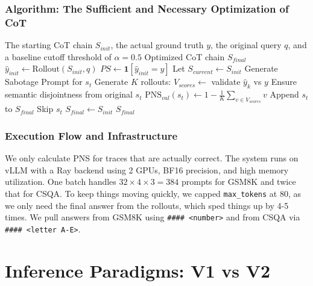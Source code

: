 \documentclass[conference,compsoc]{IEEEtran}
\begin{document}
\subsubsection{Algorithm: The Sufficient and Necessary Optimization of CoT}
\begin{algorithm}
\caption{Optimizing the CoT Sequence for Necessity and Sufficiency}
\begin{algorithmic}[1]
\REQUIRE The starting CoT chain $S_{init}$, the actual ground truth $y$, the original query $q$, and a baseline cutoff threshold of $\alpha=0.5$
\ENSURE Optimized CoT chain $S_{final}$
\STATE $\hat{y}_{init} \leftarrow \text{Rollout}(S_{init}, q)$
\STATE $PS \leftarrow \mathbf{1}[\hat{y}_{init} = y]$
    \STATE Let $S_{current} \leftarrow S_{init}$
        \STATE Generate Sabotage Prompt for $s_t$
        \STATE Generate $K$ rollouts: $V_{scores} \leftarrow$ validate $\hat{y}_k$ vs $y$
        \STATE Ensure semantic disjointness from original $s_t$
        \STATE $\text{PNS}_{val}(s_t) \leftarrow 1 - \frac{1}{K} \sum_{v \in V_{scores}} v$
            \STATE Append $s_t$ to $S_{final}$ 
        \ELSE
            \STATE Skip $s_t$ 
        \ENDIF
    \ENDFOR
\ELSE
    \STATE $S_{final} \leftarrow S_{init}$ 
\ENDIF
\RETURN $S_{final}$
\end{algorithmic}
\end{algorithm}

\subsubsection{Execution Flow and Infrastructure}
We only calculate PNS for traces that are actually correct. The system runs on vLLM \cite{b15} with a Ray backend using 2 GPUs, BF16 precision, and high memory utilization. One batch handles $32 \times 4 \times 3 = 384$ prompts for GSM8K and twice that for CSQA. To keep things moving quickly, we capped \texttt{max\_tokens} at 80, as we only need the final answer from the rollouts, which sped things up by 4-5 times. We pull answers from GSM8K using \texttt{\#\#\#\# <number>} and from CSQA via \texttt{\#\#\#\# <letter A-E>}.

\section{Inference Paradigms: V1 vs V2}
\end{document}
